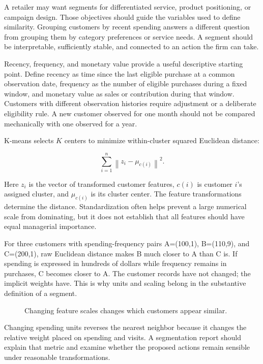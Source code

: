 \noindent A retailer may want segments for differentiated service, product
positioning, or campaign design. Those objectives should guide the
variables used to define similarity. Grouping customers by recent
spending answers a different question from grouping them by category
preferences or service needs. A segment should be interpretable,
sufficiently stable, and connected to an action the firm can take.

Recency, frequency, and monetary value provide a useful descriptive
starting point. Define recency as time since the last eligible purchase
at a common observation date, frequency as the number of eligible
purchases during a fixed window, and monetary value as sales or
contribution during that window. Customers with different observation
histories require adjustment or a deliberate eligibility rule. A new
customer observed for one month should not be compared mechanically with
one observed for a year.

K-means selects \(K\) centers to minimize within-cluster squared
Euclidean distance:

\[
\sum_{i=1}^n\left\|z_i-\mu_{c(i)}\right\|^2.
\]

Here \(z_i\) is the vector of transformed customer features, \(c(i)\) is
customer \(i\)'s assigned cluster, and \(\mu_{c(i)}\) is its cluster
center. The feature transformations determine the distance.
Standardization often helps prevent a large numerical scale from
dominating, but it does not establish that all features should have
equal managerial importance.

For three customers with spending-frequency pairs A=(100,1), B=(110,9),
and C=(200,1), raw Euclidean distance makes B much closer to A than C
is. If spending is expressed in hundreds of dollars while frequency
remains in purchases, C becomes closer to A. The customer records have
not changed; the implicit weights have. This is why units and scaling
belong in the substantive definition of a segment.

\begin{figure}[htbp]
\centering

\caption{Changing feature scales changes which customers appear similar.}\label{fig:M04_scaling}
\end{figure}

Changing spending units reverses the nearest neighbor because it changes
the relative weight placed on spending and visits. A segmentation report
should explain that metric and examine whether the proposed actions
remain sensible under reasonable transformations.

